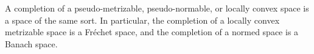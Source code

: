 A completion of a pseudo-metrizable, pseudo-normable, or locally convex space is a space of the same sort. In particular, the completion of a locally convex metrizable space is a Fr\'{e}chet space, and the completion of a normed space is a Banach space.
